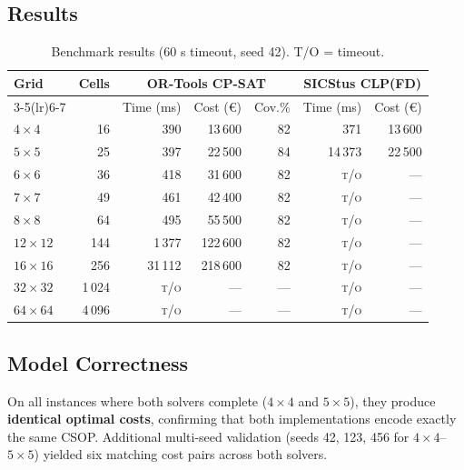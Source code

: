 \documentclass{llncs}
\begin{document}
\subsection{Results}

\begin{table}[H]
\centering
\caption{Benchmark results (60 s timeout, seed 42). T/O = timeout.}
\label{tab:benchmarks}
\begin{tabular}{lrrrrrr}
\toprule
\multirow{2}{*}{\textbf{Grid}} & \multirow{2}{*}{\textbf{Cells}}
  & \multicolumn{3}{c}{\textbf{OR-Tools CP-SAT}}
  & \multicolumn{2}{c}{\textbf{SICStus CLP(FD)}} \\
\cmidrule(lr){3-5}\cmidrule(lr){6-7}
& & Time (ms) & Cost (€) & Cov.\% & Time (ms) & Cost (€) \\
\midrule
$4{\times}4$   &    16 &      390 &   13\,600 & 82 &       371 &   13\,600 \\
$5{\times}5$   &    25 &      397 &   22\,500 & 84 &    14\,373 &   22\,500 \\
$6{\times}6$   &    36 &      418 &   31\,600 & 82 & \textsc{t/o} & --- \\
$7{\times}7$   &    49 &      461 &   42\,400 & 82 & \textsc{t/o} & --- \\
$8{\times}8$   &    64 &      495 &   55\,500 & 82 & \textsc{t/o} & --- \\
$12{\times}12$ &   144 &    1\,377 &  122\,600 & 82 & \textsc{t/o} & --- \\
$16{\times}16$ &   256 &   31\,112 &  218\,600 & 82 & \textsc{t/o} & --- \\
$32{\times}32$ & 1\,024 & \textsc{t/o} & --- & --- & \textsc{t/o} & --- \\
$64{\times}64$ & 4\,096 & \textsc{t/o} & --- & --- & \textsc{t/o} & --- \\
\bottomrule
\end{tabular}
\end{table}

\subsection{Model Correctness}

On all instances where both solvers complete ($4{\times}4$ and $5{\times}5$),
they produce \textbf{identical optimal costs}, confirming that both
implementations encode exactly the same CSOP. Additional multi-seed validation
(seeds 42, 123, 456 for $4{\times}4$--$5{\times}5$) yielded six matching
cost pairs across both solvers.
\end{document}
